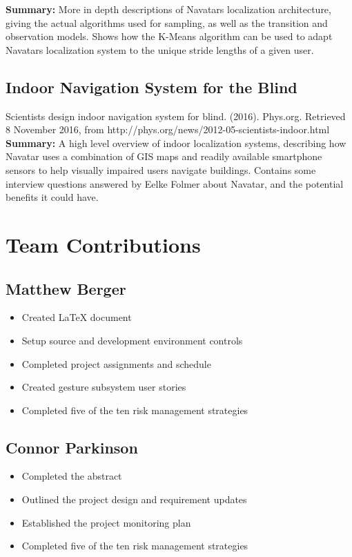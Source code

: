 \documentclass{scrreprt}
\begin{document}
\textbf{Summary:}
More in depth descriptions of Navatar\textsc{}s localization architecture, giving the actual algorithms used for sampling, as well as the transition and observation models. Shows how the K-Means algorithm can be used to adapt Navatar\textsc{}s localization system to the unique stride lengths of a given user.

\section{Indoor Navigation System for the Blind}
Scientists design indoor navigation system for blind. (2016). Phys.org. Retrieved 8 November 2016, from http://phys.org/news/2012-05-scientists-indoor.html\\

\textbf{Summary:}
A high level overview of indoor localization systems, describing how Navatar uses a combination of GIS maps and readily available smartphone sensors to help visually impaired users navigate buildings. Contains some interview questions answered by Eelke Folmer about Navatar, and the potential benefits it could have.

\chapter{Team Contributions}
	\section{Matthew Berger}
		\begin{itemize}
			\item Created LaTeX document
			\item Setup source and development environment controls
			\item Completed project assignments and schedule
			\item Created gesture subsystem user stories
			\item Completed five of the ten risk management strategies
		\end{itemize}
	\section{Connor Parkinson}
		\begin{itemize}
			\item Completed the abstract
			\item Outlined the project design and requirement updates
			\item Established the project monitoring plan
			\item Completed five of the ten risk management strategies
		\end{itemize}
\end{document}
